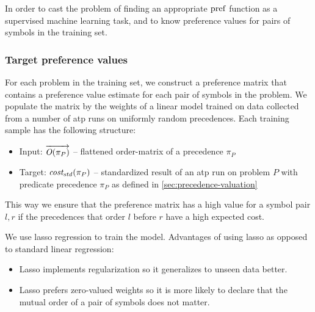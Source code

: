 In order to cast the problem of finding an appropriate \(\operatorname{pref}\) function
as a supervised machine learning task,
and to know preference values for pairs of symbols in the training set.

\subsubsection{Target preference values}
\label{sec:target-preference-values}

For each problem in the training set, we construct a preference matrix that contains a preference
value estimate for each pair of symbols in the problem.
We populate the matrix by the weights of a linear model trained on data
collected from a number of \gls{atp} runs on uniformly random precedences.
Each training sample has the following structure:

\begin{itemize}
	\item Input: \(\overrightarrow{\operatorname{\mathit{O}}(\pi_P)}\) --
	flattened \gls{order-matrix} of a precedence \(\pi_P\)
	\item Target: \(\operatorname{\mathit{cost_{std}}}(\pi_P)\) --
	standardized result of an \gls{atp} run on problem \(P\) with predicate precedence \(\pi_P\)
	as defined in \autoref{sec:precedence-valuation}
\end{itemize}

This way we ensure that the preference matrix has a high value for a symbol pair \(l, r\)
if the precedences that order \(l\) before \(r\) have a high expected cost.

We use lasso regression \cite{?} to train the model.
Advantages of using lasso as opposed to standard linear regression\cite{?}:

\begin{itemize}
	\item Lasso implements regularization so it generalizes to unseen data better.
	\item Lasso prefers zero-valued weights so it is more likely to declare that the mutual order of a pair of symbols does not matter.
\end{itemize}

